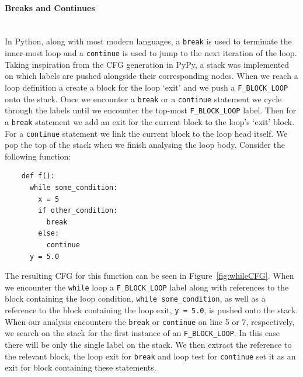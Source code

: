 \documentclass[12pt, titlepage]{article}
\begin{document}
\paragraph*{Breaks and Continues} \mbox{} \\
In Python, along with most modern languages, a \texttt{break} is used to terminate the inner-most loop and a \texttt{continue} is used to jump to the next iteration of the loop. Taking inspiration from the CFG generation in PyPy, a stack was implemented on which labels are pushed alongside their corresponding nodes. When we reach a loop definition a create a block for the loop `exit' and we push a \texttt{F\_BLOCK\_LOOP} onto the stack. Once we encounter a \texttt{break} or a \texttt{continue} statement we cycle through the labels until we encounter the top-most \texttt{F\_BLOCK\_LOOP} label. Then for a \texttt{break} statement we add an exit for the current block to the loop's `exit' block. For a \texttt{continue} statement we link the current block to the loop head itself. We pop the top of the stack when we finish analysing the loop body. Consider the following function:
\begin{lstlisting}
    def f():
      while some_condition:
        x = 5
        if other_condition:
          break
        else:
          continue
      y = 5.0
\end{lstlisting}
The resulting CFG for this function can be seen in Figure~\ref{fig:whileCFG}. When we encounter the \texttt{while} loop a \texttt{F\_BLOCK\_LOOP} label along with references to the block containing the loop condition, \texttt{while some\_condition}, as well as a reference to the block containing the loop exit, \texttt{y = 5.0}, is pushed onto the stack. When our analysis encounters the \texttt{break} or \texttt{continue} on line 5 or 7, respectively, we search on the stack for the first instance of an \texttt{F\_BLOCK\_LOOP}. In this case there will be only the single label on the stack. We then extract the reference to the relevant block, the loop exit for \texttt{break} and loop test for \texttt{continue} set it as an exit for block containing these statements.
\end{document}
